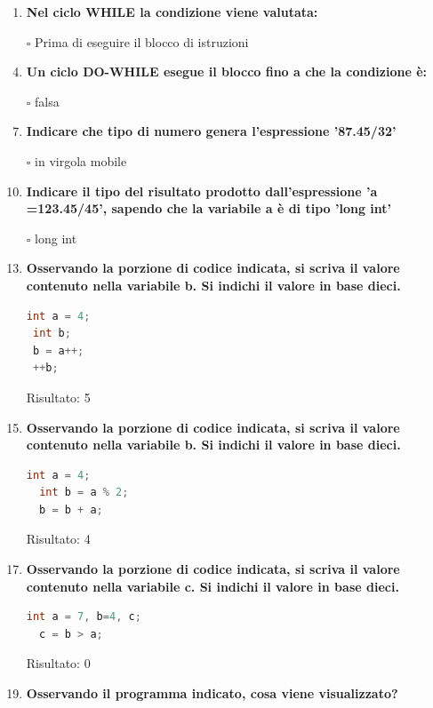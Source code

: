 \documentclass[11pt]{article}
\begin{document}
\begin{enumerate}
\item {\bf Nel ciclo WHILE la condizione viene valutata:}

\item[$\square$]  Prima di eseguire il blocco di istruzioni


\item [\nonumber]
\item {\bf Un ciclo DO-WHILE  esegue il blocco fino a che la condizione \`{e}:}

\item [$\square$] falsa

\item [\nonumber]
\item{\bf Indicare che tipo di numero genera l'espressione '87.45/32'}


\item[$\square$] in virgola mobile

\item [\nonumber]
\item {\bf Indicare il tipo del risultato prodotto dall'espressione 'a =123.45/45', sapendo che la variabile a \`{e} di tipo 'long int'}

\item[$\square$] long int

\item [\nonumber]
 \item {\bf Osservando la porzione di codice indicata, si scriva il valore contenuto nella variabile b. Si indichi il valore in base dieci.}
  \begin{lstlisting}[language=c]
 int a = 4;
 int b; 
 b = a++;
 ++b;
 \end{lstlisting}
 Risultato:  5
 \item [\nonumber]
 \item{\bf Osservando la porzione di codice indicata, si scriva il valore contenuto nella variabile b. Si indichi il valore in base dieci.}
 
  \begin{lstlisting}[language=c]
  int a = 4;
  int b = a % 2;
  b = b + a;
 \end{lstlisting}
  Risultato:  4
  \item [\nonumber]
  \item {\bf Osservando la porzione di codice indicata, si scriva il valore contenuto nella variabile c. Si indichi il valore in base dieci.}
 
  \begin{lstlisting}[language=c]
  int a = 7, b=4, c;
  c = b > a;
  \end{lstlisting}
  Risultato: 0
  \item [\nonumber]
  \item {\bf Osservando il programma indicato, cosa viene visualizzato?}
  

\end{enumerate}
\end{document}

